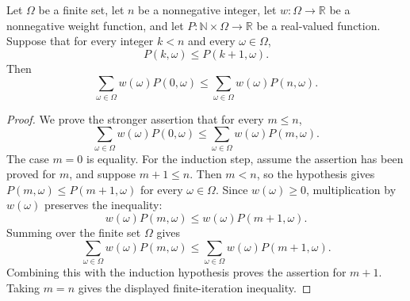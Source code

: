 \begin{helper}
Let \(\Omega\) be a finite set, let \(n\) be a nonnegative integer, let
\(w:\Omega\to\mathbb{R}\) be a nonnegative weight function, and let
\(P:\mathbb{N}\times\Omega\to\mathbb{R}\) be a real-valued function.  Suppose
that for every integer \(k<n\) and every \(\omega\in\Omega\),
\[
P(k,\omega)\le P(k+1,\omega).
\]
Then
\[
\sum_{\omega\in\Omega} w(\omega)P(0,\omega)
\le
\sum_{\omega\in\Omega} w(\omega)P(n,\omega).
\]
\end{helper}
\begin{proof}
We prove the stronger assertion that for every \(m\le n\),
\[
\sum_{\omega\in\Omega}w(\omega)P(0,\omega)
\le
\sum_{\omega\in\Omega}w(\omega)P(m,\omega).
\]
The case \(m=0\) is equality.  For the induction step, assume the assertion
has been proved for \(m\), and suppose \(m+1\le n\).  Then \(m<n\), so the
hypothesis gives \(P(m,\omega)\le P(m+1,\omega)\) for every
\(\omega\in\Omega\).  Since \(w(\omega)\ge 0\), multiplication by
\(w(\omega)\) preserves the inequality:
\[
w(\omega)P(m,\omega)\le w(\omega)P(m+1,\omega).
\]
Summing over the finite set \(\Omega\) gives
\[
\sum_{\omega\in\Omega}w(\omega)P(m,\omega)
\le
\sum_{\omega\in\Omega}w(\omega)P(m+1,\omega).
\]
Combining this with the induction hypothesis proves the assertion for
\(m+1\).  Taking \(m=n\) gives the displayed finite-iteration inequality.
\end{proof}
